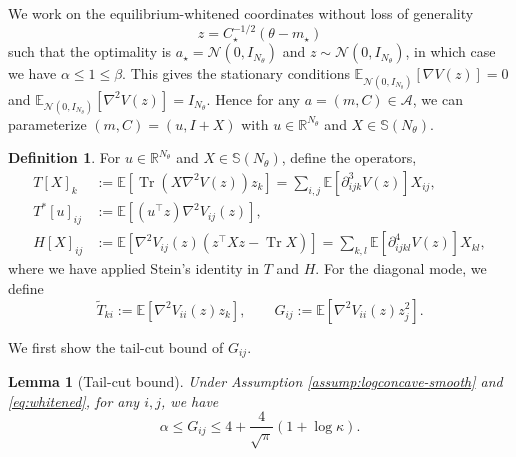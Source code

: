 \documentclass[11pt]{article}
\theoremstyle{plain}
\newtheorem{lemma}[theorem]{Lemma}
\theoremstyle{definition}
\newtheorem{definition}[theorem]{Definition}
\theoremstyle{remark}
\newcommand{\R}{\mathbb{R}}
\newcommand{\E}{\mathbb{E}}
\newcommand{\Tr}{\operatorname{Tr}}
\newcommand{\Sym}{\mathbb{S}}
\newcommand{\Aspace}{\mathcal{A}}
\begin{document}
We work on the equilibrium-whitened coordinates without loss of generality
\begin{equation}\label{eq:whitened}
    z = C_\star^{-1/2} (\theta - m_\star)
\end{equation}
such that the optimality is $a_\star = \mathcal{N} (0, I_{N_\theta})$ and $z \sim \mathcal{N} (0, I_{N_\theta})$, in which case we have $\alpha \leq 1 \leq \beta$.
This gives the stationary conditions $\E_{\mathcal{N} (0, I_{N_\theta})} [\nabla V(z)] = 0$ and $\E_{\mathcal{N} (0, I_{N_\theta})} [\nabla^2 V(z)] = I_{N_\theta}$. Hence for any $a = (m, C) \in \Aspace$, we can parameterize $(m, C) = (u, I + X)$ with $u \in \R^{N_\theta}$ and $X \in \Sym (N_\theta)$.

\begin{definition}\label{def:local-operators}
    For $u \in \R^{N_\theta}$ and $X \in \Sym (N_\theta)$, define the operators,
    \begin{align*}
        T [X]_k &:= \E[\Tr (X \nabla^2 V(z)) z_k] = \sum_{i, j} \E[\partial^3_{ijk} V(z)] X_{ij}, \\
        T^* [u]_{ij} &:= \E[(u^\top z) \nabla^2 V_{ij} (z)], \\
        H [X]_{ij} &:= \E[\nabla^2 V_{ij} (z) (z^\top Xz - \Tr X)] = \sum_{k, l} \E[\partial^4_{ijkl} V(z)] X_{kl},
    \end{align*}
    where we have applied Stein's identity in $T$ and $H$. For the diagonal mode, we define
    \begin{equation*}
        \widetilde{T}_{ki} := \E[\nabla^2 V_{ii} (z) z_k], \qquad G_{ij} := \E[\nabla^2 V_{ii} (z) z_j^2].
    \end{equation*}
\end{definition}

We first show the tail-cut bound of $G_{ij}$.

\begin{lemma}[Tail-cut bound]\label{lem:tailcut}
    Under Assumption \ref{assump:logconcave-smooth} and \eqref{eq:whitened}, for any $i, j$, we have
    \begin{equation*}
        \alpha \leq G_{ij} \leq 4 + \frac{4}{\sqrt{\pi}} ( 1 + \log \kappa).
    \end{equation*}
\end{lemma}
\end{document}
